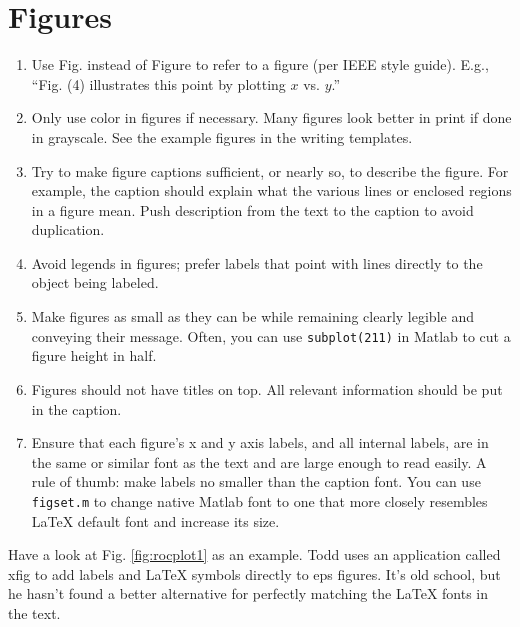 \documentclass[10pt,journal,twocolumn]{IEEEtran} %
\begin{document}
\section{Figures}
\begin{enumerate}
\item Use Fig. instead of Figure to refer to a figure (per IEEE style guide).
  E.g., ``Fig. (4) illustrates this point by plotting $x$ vs. $y$.''
\item Only use color in figures if necessary.  Many figures look better in
  print if done in grayscale.  See the example figures in the writing templates.
\item Try to make figure captions sufficient, or nearly so, to describe the
  figure.  For example, the caption should explain what the various lines or
  enclosed regions in a figure mean.  Push description from the text to the
  caption to avoid duplication.
\item Avoid legends in figures; prefer labels that point with lines directly
  to the object being labeled.
\item Make figures as small as they can be while remaining clearly legible and
  conveying their message.  Often, you can use {\tt subplot(211)} in Matlab to
  cut a figure height in half.
\item Figures should not have titles on top.  All relevant information should
  be put in the caption.
\item Ensure that each figure's x and y axis labels, and all internal labels,
  are in the same or similar font as the text and are large enough to read
  easily.  A rule of thumb: make labels no smaller than the caption font.  You
  can use {\tt figset.m} to change native Matlab font to one that more closely
  resembles LaTeX default font and increase its size.
\end{enumerate}

Have a look at Fig. \ref{fig:rocplot1} as an example.  Todd uses an
application called xfig to add labels and LaTeX symbols directly to eps
figures.  It's old school, but he hasn't found a better alternative for
perfectly matching the LaTeX fonts in the text.
\end{document}
